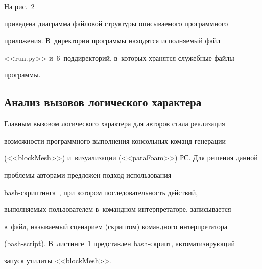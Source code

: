 На рис.~2 


приведена диаграмма файловой структуры описываемого программного 


приложения. В~директории программы находятся исполняемый файл 


<<run.py>> и~6~поддиректорий, в~которых хранятся служебные файлы 


про\-граммы.


{





}











\subsection{Анализ вызовов логического характера}











  Главным вызовом логического характера для авторов стала реализация 


возможности программного выполнения консольных команд генерации 


(<<blockMesh>>) и~визуализации (<<paraFoam>>) РС. Для решения данной 


проб\-ле\-мы авторами предложен подход использования  


bash-скрип\-тин\-га~\cite{12-ch}, при котором последовательность действий, 


выполняемых пользователем в~командном интерпретаторе, записывается 


в~файл, называемый сценарием (скриптом) командного интерпретатора  


(bash-script). В~листинге~1 представлен bash-скрипт, автоматизирующий 


запуск утилиты <<blockMesh>>. 





\medskip










